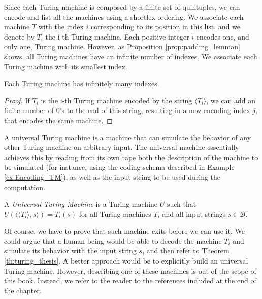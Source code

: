 Since each Turing machine is composed by a finite set of quintuples, we can encode and list all the machines using a shortlex ordering. We associate each machine $T$ with the index $i$ corresponding to its position in this list, and we denote by $T_i$ the i-th Turing machine. Each positive integer $i$ encodes one, and only one, Turing machine. However, as Proposition \ref{prop:padding_lemman} shows, all Turing machines have an infinite number of indexes. We associate each Turing machine with its smallest index.

\begin{proposition}
\label{prop:padding_lemman}
Each Turing machine has infinitely many indexes.
\end{proposition}
\begin{proof}
If $T_i$ is the i-th Turing machine encoded by the string $\langle T_i \rangle$, we can add an finite number of 0's to the end of this string, resulting in a new encoding index $j$, that encodes the same machine.
\end{proof}

A universal Turing machine is a machine that can simulate the behavior of any other Turing machine on arbitrary input. The universal machine essentially achieves this by reading from its own tape both the description of the machine to be simulated (for instance, using the coding schema described in Example \ref{ex:Encoding_TM}), as well as the input string to be used during the computation.

\begin{definition}
\label{def:Universal-Turing-Machine}
A \emph{Universal Turing Machine} is a Turing machine $U$ such that $U(\langle \langle T_i\rangle, s \rangle) = T_i(s)$ for all Turing machines $T_i$ and all input strings $s \in \mathcal{B}$.
\end{definition}

Of course, we have to prove that such machine exits before we can use it. We could argue that a human being would be able to decode the machine $T_i$ and simulate its behavior with the input string $s$, and then refer to Theorem \ref{th:turing_thesis}. A better approach would be to explicitly build an universal Turing machine. However, describing one of these machines is out of the scope of this book. Instead, we refer to the reader to the references included at the end of the chapter.

%
%

